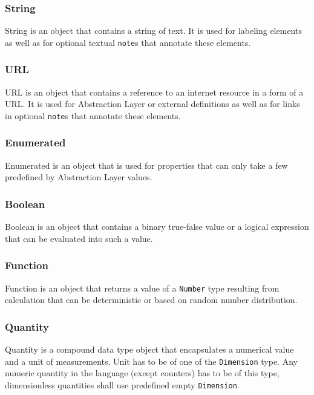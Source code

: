 \documentclass{article}
\begin{document}
\subsubsection{String}

String is an object that contains a string of text. It is used for labeling
elements as well as for optional textual {\tt note}s that annotate these
elements.

\subsubsection{URL}

URL is an object that contains a reference to an internet resource in a form
of a URL. It is used for Abstraction Layer or external definitions as well as
for links in optional {\tt note}s that annotate these elements.

\subsubsection{Enumerated}

Enumerated is an object that is used for properties that can only take
a few predefined by Abstraction Layer values.

\subsubsection{Boolean}

Boolean is an object that contains a binary true-false value or a logical
expression that can be evaluated into such a value.

\subsubsection{Function}

Function is an object that returns a value of a {\tt Number} type resulting
from calculation that can be deterministic or based on random number
distribution.

\subsubsection{Quantity}

Quantity is a compound data type object that encapsulates a numerical value
and a unit of measurements. Unit has to be of one of the {\tt Dimension} type.
Any numeric quantity in the language (except counters) has to be of this type,
dimensionless quantities shall use predefined empty {\tt Dimension}.
\end{document}
